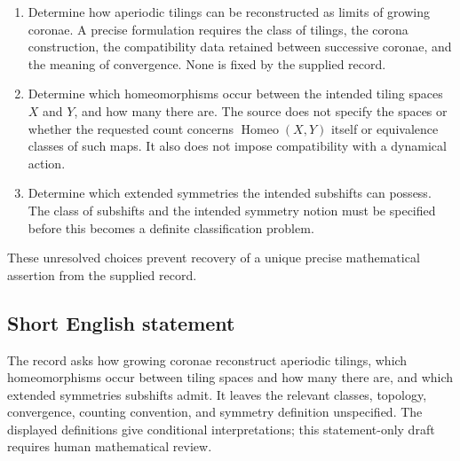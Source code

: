 \documentclass[11pt]{article}
\begin{document}
\begin{enumerate}
\item Determine how aperiodic tilings can be reconstructed as limits of growing coronae. A precise formulation requires the class of tilings, the corona construction, the compatibility data retained between successive coronae, and the meaning of convergence. None is fixed by the supplied record.
\item Determine which homeomorphisms occur between the intended tiling spaces \(X\) and \(Y\), and how many there are. The source does not specify the spaces or whether the requested count concerns \(\operatorname{Homeo}(X,Y)\) itself or equivalence classes of such maps. It also does not impose compatibility with a dynamical action.
\item Determine which extended symmetries the intended subshifts can possess. The class of subshifts and the intended symmetry notion must be specified before this becomes a definite classification problem.
\end{enumerate}
These unresolved choices prevent recovery of a unique precise mathematical assertion from the supplied record.
\subsection{Short English statement}
The record asks how growing coronae reconstruct aperiodic tilings, which homeomorphisms occur between tiling spaces and how many there are, and which extended symmetries subshifts admit. It leaves the relevant classes, topology, convergence, counting convention, and symmetry definition unspecified. The displayed definitions give conditional interpretations; this statement-only draft requires human mathematical review.
\end{document}
